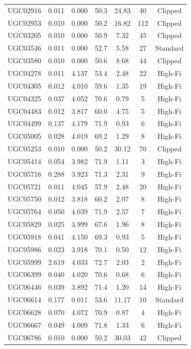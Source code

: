 \begin{longtable}{lcccccc}
UGC02916 & 0.011 & 0.000 & 50.3 & 24.83 & 40 & Clipped \\
UGC02953 & 0.010 & 0.000 & 50.2 & 16.82 & 112 & Clipped \\
UGC03205 & 0.010 & 0.000 & 50.9 & 7.32 & 45 & Clipped \\
UGC03546 & 0.011 & 0.000 & 52.7 & 5.58 & 27 & Standard \\
UGC03580 & 0.010 & 0.000 & 50.6 & 8.68 & 44 & Clipped \\
UGC04278 & 0.011 & 4.137 & 53.4 & 2.48 & 22 & High-Fi \\
UGC04305 & 0.012 & 4.010 & 59.6 & 1.35 & 19 & High-Fi \\
UGC04325 & 0.037 & 4.052 & 70.6 & 0.79 & 5 & High-Fi \\
UGC04483 & 0.012 & 3.817 & 60.0 & 4.75 & 5 & High-Fi \\
UGC04499 & 0.137 & 4.179 & 71.9 & 0.93 & 6 & High-Fi \\
UGC05005 & 0.028 & 4.019 & 69.2 & 1.29 & 8 & High-Fi \\
UGC05253 & 0.010 & 0.000 & 50.2 & 30.12 & 70 & Clipped \\
UGC05414 & 0.054 & 3.982 & 71.9 & 1.11 & 3 & High-Fi \\
UGC05716 & 0.288 & 3.923 & 71.3 & 2.31 & 9 & High-Fi \\
UGC05721 & 0.011 & 4.045 & 57.9 & 2.48 & 20 & High-Fi \\
UGC05750 & 0.012 & 3.818 & 60.2 & 2.07 & 8 & High-Fi \\
UGC05764 & 0.050 & 4.039 & 71.9 & 2.57 & 7 & High-Fi \\
UGC05829 & 0.025 & 3.999 & 67.6 & 1.96 & 8 & High-Fi \\
UGC05918 & 0.041 & 4.150 & 69.3 & 0.93 & 5 & High-Fi \\
UGC05986 & 0.023 & 3.918 & 70.1 & 0.50 & 12 & High-Fi \\
UGC05999 & 2.619 & 4.033 & 72.7 & 2.03 & 2 & High-Fi \\
UGC06399 & 0.040 & 4.020 & 70.6 & 0.68 & 6 & High-Fi \\
UGC06446 & 0.039 & 3.892 & 71.4 & 1.20 & 14 & High-Fi \\
UGC06614 & 0.177 & 0.011 & 53.6 & 11.17 & 10 & Standard \\
UGC06628 & 0.070 & 4.072 & 70.9 & 0.87 & 4 & High-Fi \\
UGC06667 & 0.049 & 4.009 & 71.8 & 1.33 & 6 & High-Fi \\
UGC06786 & 0.010 & 0.000 & 50.2 & 30.03 & 42 & Clipped \\

\end{longtable}
